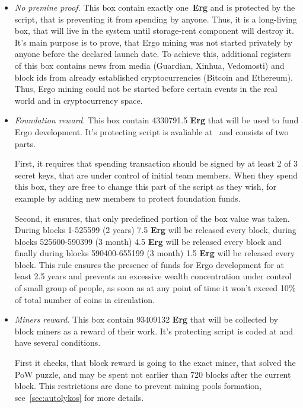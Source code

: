 \documentclass[]{article}
\newcommand{\Ergo}{Ergo}
\newcommand{\Erg}{\textbf{Erg}}
\begin{document}
    \begin{itemize}
        \item{\em No premine proof.} This box contain exactly one~\Erg{} and is protected by the script,
        that is preventing it from spending by anyone.
        Thus, it is a long-living box, that will live in the system until storage-rent component will
        destroy it.
        It's main purpose is to prove, that \Ergo{} mining was not started privately by anyone before
        the declared launch date.
        To achieve this, additional registers of this box contains news from media (Guardian, Xinhua, Vedomosti)
        and block ids from already established cryptocurrencies (Bitcoin and Ethereum).
        Thus, \Ergo{} mining could not be started before certain events in the real world and in
        cryptocurrency space.

        \item{\em Foundation reward.} This box contain 4330791.5 \Erg{} that will be used to fund \Ergo{}
        development.
        It's protecting script is avaliable at~\cite{link to corresponding sigma tree} and consists of two parts.

        First, it requires that spending transaction should be signed by at least 2 of 3 secret keys,
        that are under control of initial team members. When they spend this box, they are free to
        change this part of the script as they wish, for example by adding new members to protect foundation
        funds.

        Second, it ensures, that only predefined portion of the box value was taken.
        During blocks 1-525599 (2 years) 7.5 \Erg{} will be released every block,
        during blocks 525600-590399 (3 month) 4.5 \Erg{} will be released every block and finally
        during blocks 590400-655199 (3 month) 1.5 \Erg{} will be released every block.
        This rule ensures the presence of funds for \Ergo{} development for at least 2.5 years and
        prevents an excessive wealth concentration under control of small group of people, as soon
        as at any point of time it won't exceed 10\% of total number of coins in circulation.

        \item{\em Miners reward.} This box contain 93409132 \Erg{} that will be collected by block miners
        as a reward of their work.
        It's protecting script is coded at \cite{link to corresponding sigma tree} and have several conditions.

        First it checks, that block reward is going to the exact miner, that solved the PoW puzzle, and
        may be spent not earlier than 720 blocks after the current block.
        This restrictions are done to prevent mining pools formation, see~\ref{sec:autolykos} for more details.


\end{itemize}
\end{document}
